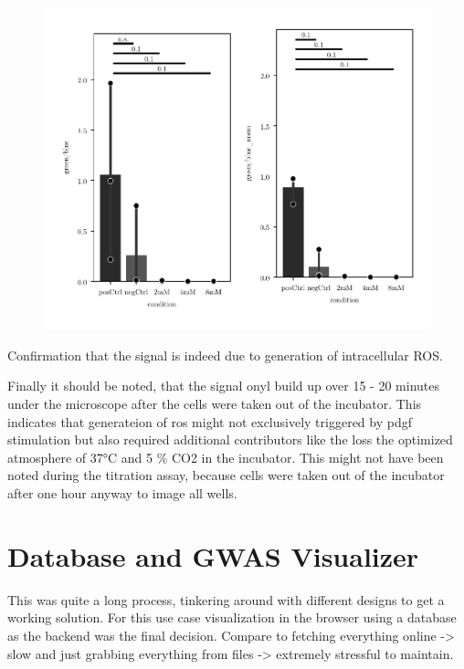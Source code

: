     \begin{figure}[h]
    \capstart
        \centering
    	\includegraphics{Abbildung/NAC_quench.pdf}

    	\begin{minipage}{\captionwidth}
    		\caption[NAC quench]{}
    		\label{fig:NAC_quench}
    	\end{minipage}
    \end{figure}

    Confirmation that the signal is indeed due to generation of intracellular ROS.

    Finally it should be noted, that the signal onyl build up over 15 - 20 minutes under the microscope after the cells were taken out of the incubator. This indicates that generateion of \ac{ros} might not exclusively triggered by \ac{pdgf} stimulation but also required additional contributors like the loss the optimized atmosphere of 37°C and 5 \% CO2 in the incubator. This might not have been noted during the titration assay, because cells were taken out of the incubator after one hour anyway to image all wells.

\section{Database and GWAS Visualizer}
This was quite a long process, tinkering around with different designs to get a working solution. For this use case visualization in the browser using a database as the backend was the final decision. Compare to fetching everything online -> slow and just grabbing everything from files -> extremely stressful to maintain.

